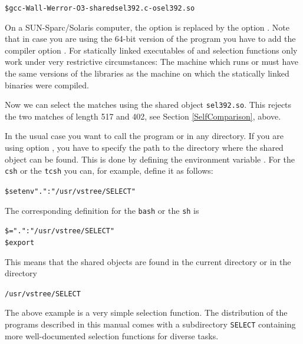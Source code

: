 \documentclass[12pt,titlepage]{article}
\newcommand{\EXECUTE}[1]{}
\newenvironment{LargeOutput}{%
 \begin{footnotesize}
 \begin{alltt}}{%
 \end{alltt}
 \end{footnotesize}%
 \addvspace{-\medskipamount}
}
\begin{document}
\begin{AboutVmatch}
\begin{LargeOutput}
\$ gcc -Wall -Werror -O3 -shared sel392.c -o sel392.so
\end{LargeOutput}

On a  SUN-Sparc/Solaris computer, the option 
 is replaced by the option .
Note that in case you are using the 64-bit version of the program
you have to add the compiler option . For statically linked 
executables of \VM and \VMS
selection functions only work under very restrictive circumstances:
The machine which runs \VM or \VMS must have the same versions of the
libraries as the machine on which the statically linked binaries
were compiled.

Now we can select the matches using the shared object \texttt{sel392.so}.
This rejects the two matches of length 517 and 402, see Section 
\ref{SelfComparison}, above.

\EXECUTE{vmatch -l 350 -selfun sel392.so atEST}

In the usual case you want to call the program \VM or \VMS in any directory.
If you are using option , you have to specify the
path to the directory where the shared object can be found. This is done by 
defining the environment variable \LDlibpath. For the \texttt{csh} or the
\texttt{tcsh} you can, for example, define it as follows:

\begin{LargeOutput}
\$ setenv \LDlibpath ".":"/usr/vstree/SELECT"
\end{LargeOutput}

The corresponding definition for the \texttt{bash} or the \texttt{sh} is

\begin{LargeOutput}
\$ \LDlibpath=".":"/usr/vstree/SELECT"
\$ export \LDlibpath
\end{LargeOutput}

This means that the shared objects are found in the current directory
or in the directory

\begin{LargeOutput}
/usr/vstree/SELECT
\end{LargeOutput}
\end{AboutVmatch}

The above example is a very simple selection function.
The distribution of the programs described in this manual comes with a 
subdirectory \texttt{SELECT} containing more well-documented
selection functions for diverse tasks.
\end{document}
